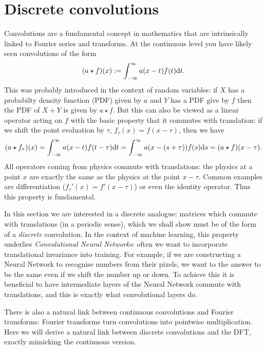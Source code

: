 
\section{Discrete convolutions}
Convolutions are a fundamental concept in mathematics that are intrinsically linked to Fourier series and transforms. At the continuous level you have likely seen convolutions of the form
\[
(a \star f)(x) := \int_{-\infty}^\infty a(x-t) f(t) {\rm d}t.
\]
This was probably introduced in the context of random variables: if $X$ has a probabilty density function (PDF) given by $a$ and $Y$ has a PDF give by $f$ then the PDF of $X + Y$ is given by $a \ensuremath{\star} f$. But this can also be viewed as a linear operator acting on $f$ with the basic property that it commutes with translation: if we shift the point evaluation by $\ensuremath{\tau}$, $f_\ensuremath{\tau}(x) = f(x - \ensuremath{\tau})$, then we have
\[
(a \star f_\tau)(x) = \int_{-\infty}^\infty a(x-t) f(t-\tau) {\rm d}t = \int_{-\infty}^\infty a(x-(s+\tau)) f(s) {\rm d}s = (a \star f)(x - \tau).
\]
All operators coming from physics commute with translations: the physics at a point $x$ are exactly the same as the physics at the point $x- \ensuremath{\tau}$. Common examples are differentiation ($f_\ensuremath{\tau}'(x) = f'(x - \ensuremath{\tau})$) or even the identity operator. Thus this property is fundamental. 

In this section we are interested in a discrete analogue: matrices which commute with translations (in a periodic sense), which we shall show must be of the form of a \emph{discrete} convolution. In the context of machine learning, this property underlies \emph{Convolutional Neural Networks}: often we want to incorporate translational invariance into training. For example, if we are constructing a Neural Network to recognise numbers from their pixels, we want to the answer to be the same even if we shift the number up or down. To achieve this it is beneficial to have intermediate layers of the Neural Network commute with translations, and this is exactly what convolutional layers do.

There is also a natural link between continuous convolutions and Fourier transforms: Fourier transforms turn convolutions into pointwise multiplication.   Here we will derive a natural link between discrete convolutions and the DFT, exactly mimicking the continuous version.

